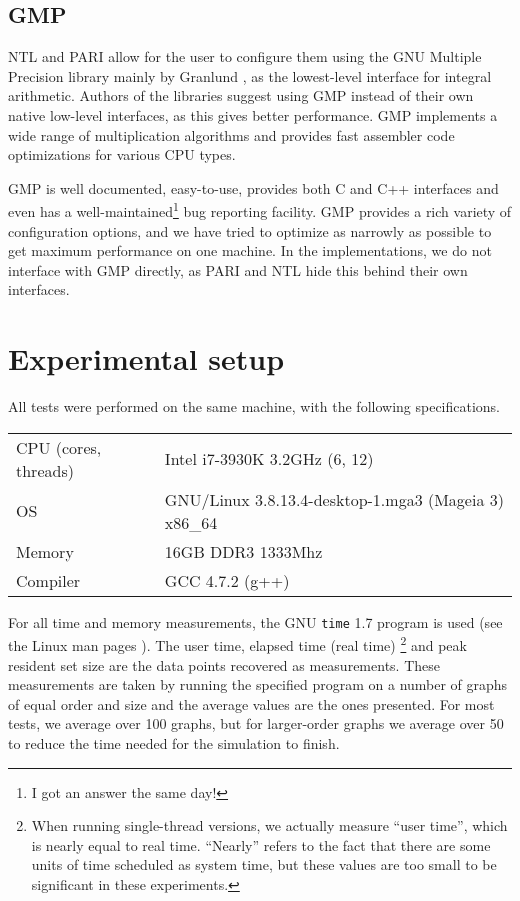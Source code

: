 \documentclass{cslthse-msc}
\newcommand{\code}{\texttt}
\begin{document}
\subsection{GMP}
NTL and PARI allow for the user to configure them using the GNU Multiple Precision library mainly by Granlund \cite{gmp}, as the lowest-level interface for integral arithmetic. Authors of the libraries suggest using GMP instead of their own native low-level interfaces, as this gives better performance. GMP implements a wide range of multiplication algorithms and provides fast assembler code optimizations for various CPU types.

GMP is well documented, easy-to-use, provides both C and C++ interfaces and even has a well-maintained\footnote{I got an answer the same day!} bug reporting facility. GMP provides a rich variety of configuration options, and we have tried to optimize as narrowly as possible to get maximum performance on one machine. In the implementations, we do not interface with GMP directly, as PARI and NTL hide this behind their own interfaces.


\section{Experimental setup}\label{experimentalsetup}
All tests were performed on the same machine, with the following specifications.

\begin{center}
\begin{tabular}{l|l}
CPU (cores, threads) & Intel i7-3930K 3.2GHz (6, 12) \\ 
OS & GNU/Linux 3.8.13.4-desktop-1.mga3 (Mageia 3) x86\_64 \\ 
Memory & 16GB DDR3 1333Mhz \\ 
Compiler & GCC 4.7.2 (g++) \\ 
\end{tabular}
\end{center}

For all time and memory measurements, the GNU \code{time} 1.7 program is used (see the Linux man pages \cite{time}). The user time, elapsed time (real time)%
\footnote{When running single-thread versions, we actually measure ``user time'', which is nearly equal to real time. ``Nearly'' refers to the fact that there are some units of time scheduled as system time, but these values are too small to be significant in these experiments.}
and peak resident set size are the data points recovered as measurements. These measurements are taken by running the specified program on a number of graphs of equal order and size and the average values are the ones presented. For most tests, we average over 100 graphs, but for larger-order graphs we average over 50 to reduce the time needed for the simulation to finish.
\end{document}
